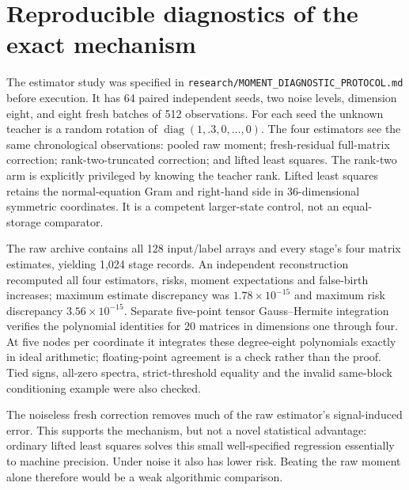 \section{Reproducible diagnostics of the exact mechanism}
\label{sec:moment-experiments}
The estimator study was specified in
\texttt{research/MOMENT\_DIAGNOSTIC\_PROTOCOL.md} before execution. It has
64 paired independent seeds, two noise levels, dimension eight, and eight
fresh batches of 512 observations. For each seed the unknown teacher is a
random rotation of $\operatorname{diag}(1,.3,0,\ldots,0)$. The four
estimators see the same chronological observations: pooled raw moment;
fresh-residual full-matrix correction; rank-two-truncated correction; and
lifted least squares. The rank-two arm is explicitly privileged by knowing
the teacher rank. Lifted least squares retains the normal-equation Gram and
right-hand side in 36-dimensional symmetric coordinates. It is a competent
larger-state control, not an equal-storage comparator.

The raw archive contains all 128 input/label arrays and every stage's four
matrix estimates, yielding 1,024 stage records. An independent reconstruction
recomputed all four estimators, risks, moment expectations and false-birth
increases; maximum estimate discrepancy was $1.78\times10^{-15}$ and
maximum risk discrepancy $3.56\times10^{-15}$. Separate five-point tensor
Gauss--Hermite integration verifies the polynomial identities for 20 matrices
in dimensions one through four. At five nodes per coordinate it integrates
these degree-eight polynomials exactly in ideal arithmetic; floating-point
agreement is a check rather than the proof. Tied signs, all-zero spectra,
strict-threshold equality and the invalid same-block conditioning example
were also checked.

\begin{table}[t]
\centering\small

\caption{Mean excess squared prediction risk after 4,096 labels over 64
independent seeds. These are estimator diagnostics, not trained-factor
neural trajectories. Full intervals and raw outcomes are in
\texttt{results/moments/findings.json}. The last two rows have explicitly
different prior information or retained-state requirements.}
\label{tab:moments}
\end{table}

The noiseless fresh correction removes much of the raw estimator's
signal-induced error. This supports the mechanism, but not a novel
statistical advantage: ordinary lifted least squares solves this small
well-specified regression essentially to machine precision. Under noise it
also has lower risk. Beating the raw moment alone therefore would be a weak
algorithmic comparison.


